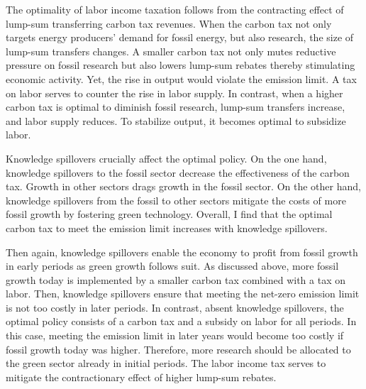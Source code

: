 

The optimality of labor income taxation follows from the contracting effect of lump-sum transferring carbon tax revenues. When the carbon tax not only targets energy producers’ demand for fossil energy, but also research, the size of lump-sum transfers changes. A smaller carbon tax not only mutes reductive pressure on fossil research but also lowers lump-sum rebates thereby stimulating economic activity. Yet, the rise in output would violate the emission limit. A tax on labor serves to counter the rise in labor supply. In contrast, when a higher carbon tax is optimal to diminish fossil research, lump-sum transfers increase, and labor supply reduces. To stabilize output, it becomes optimal to subsidize labor. 

Knowledge spillovers crucially affect the optimal policy.  On the one hand, knowledge spillovers to the fossil sector decrease the effectiveness of the carbon tax. Growth in other sectors drags growth in the fossil sector. On the other hand, knowledge spillovers from the fossil to other sectors mitigate the costs of more fossil growth by fostering green technology. 
Overall, I find that the optimal carbon tax to meet the emission limit increases with knowledge spillovers.
 
Then again, knowledge spillovers enable the economy to profit from fossil growth in early periods as green growth follows suit.  As discussed above, more fossil growth today is implemented by a smaller carbon tax combined with a tax on labor. Then, knowledge spillovers ensure that meeting the net-zero emission limit is not too costly in later periods. 
In contrast, absent knowledge spillovers, the optimal policy consists of a carbon tax and a subsidy on labor for all periods. In this case, meeting the emission limit in later years would become too costly if fossil growth today was higher. Therefore, more research should be allocated to the green sector already in initial periods. The labor income tax serves to mitigate the contractionary effect of higher lump-sum rebates. 

